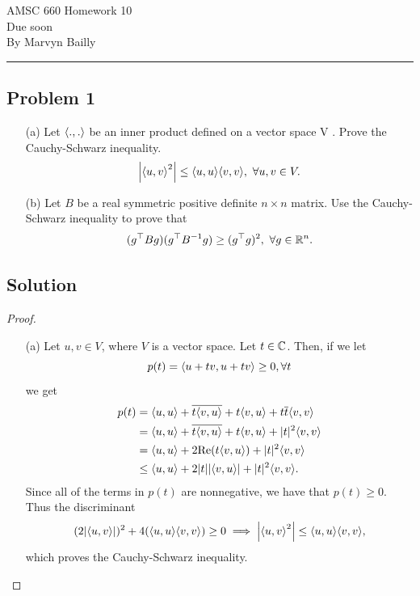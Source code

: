\documentclass[12pt]{report}
\begin{document}
\large
\begin{center}
AMSC 660 Homework 10\\
Due soon\\
By Marvyn Bailly\\
\end{center}
\normalsize
\hrule



\begin{problem}%
\subsection*{Problem 1}

\begin{enumerate}
    \item [(a)] Let ${\left\langle.,.\right\rangle}$ be an inner product defined on a vector space V . Prove the Cauchy-Schwarz inequality.
    \[
        {\left|{\left\langle u,v\right\rangle}^2\right|} \leq {\left\langle u,u\right\rangle}{\left\langle v,v\right\rangle}, ~\forall u,v \in V. 
    \]
    
    
    \item [(b)] Let $B$ be a real symmetric positive definite $n \times n$ matrix. Use the Cauchy-Schwarz inequality to prove that
    \[
         (g^\top B g)(g^\top B^{-1} g) \geq (g^\top g)^2, ~\forall g \in {\mathbb R}^n.
    \]

\end{enumerate}

\subsection*{Solution}
\begin{proof}
\begin{enumerate}
    \item [(a)] Let $u,v \in V$, where $V$ is a vector space. Let $t \in {\mathbb C}$. Then, if we let
    \[
         p(t) = {\left\langle u+tv,u+tv\right\rangle} \geq 0, \forall t
    \]
    we get
    \begin{align*}
        p(t) &= {\left\langle u,u\right\rangle} + \overline{ t {\left\langle v,u\right\rangle}} + t{\left\langle v,u\right\rangle} + t\overline{t}{\left\langle v,v\right\rangle}\\
        &= {\left\langle u,u\right\rangle} + \overline{ t {\left\langle v,u\right\rangle}} + t{\left\langle v,u\right\rangle} + |t|^2{\left\langle v,v\right\rangle}\\
        &= {\left\langle u,u\right\rangle} + 2\text{Re}(t{\left\langle v,u\right\rangle}) + |t|^2{\left\langle v,v\right\rangle}\\
        &\leq {\left\langle u,u\right\rangle} + 2|t||{\left\langle v,u\right\rangle}| + |t|^2{\left\langle v,v\right\rangle}.
    \end{align*} 
    Since all of the terms in $p(t)$ are nonnegative, we have that $p(t) \geq 0$. Thus the discriminant
    \begin{align*}
        (2|{\left\langle u,v\right\rangle}|)^2 + 4({\left\langle u,u\right\rangle}{\left\langle v,v\right\rangle}) \geq 0 \implies {\left|{\left\langle u,v\right\rangle}^2\right|} \leq {\left\langle u,u\right\rangle}{\left\langle v,v\right\rangle},  
    \end{align*}
    which proves the Cauchy-Schwarz inequality.



\end{enumerate}
\end{proof}
\end{problem}
\end{document}
